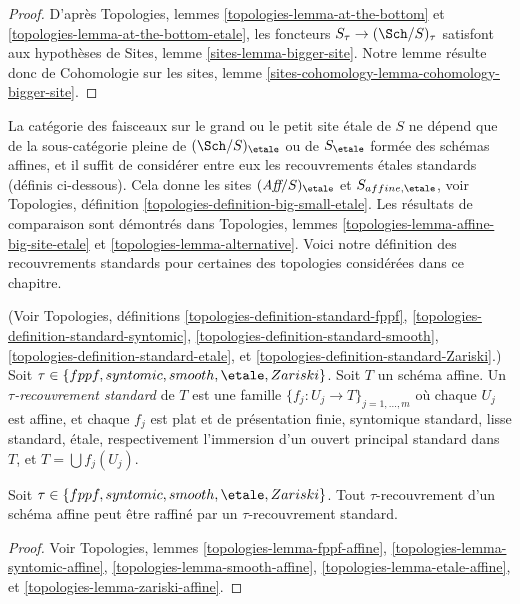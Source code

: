 \begin{proof}
D'apr\`es
Topologies, lemmes \ref{topologies-lemma-at-the-bottom} et
\ref{topologies-lemma-at-the-bottom-etale},
les foncteurs $S_\tau \to (\Sch/S)_\tau$
satisfont aux hypoth\`eses de
Sites, lemme \ref{sites-lemma-bigger-site}.
Notre lemme r\'esulte donc de
Cohomologie sur les sites, lemme \ref{sites-cohomology-lemma-cohomology-bigger-site}.
\end{proof}

\noindent
La cat\'egorie des faisceaux sur le grand ou le petit site \'etale de $S$ ne d\'epend que
de la sous-cat\'egorie pleine de $(\Sch/S)_\etale$ ou de $S_\etale$ form\'ee des
sch\'emas affines, et il suffit de consid\'erer entre eux les recouvrements \'etales standards
(d\'efinis ci-dessous). Cela donne les sites
$(\textit{Aff}/S)_\etale$ et $S_{affine, \etale}$, voir
Topologies, définition \ref{topologies-definition-big-small-etale}.
Les r\'esultats de comparaison sont d\'emontr\'es dans Topologies,
lemmes \ref{topologies-lemma-affine-big-site-etale} et
\ref{topologies-lemma-alternative}. Voici notre d\'efinition des
recouvrements standards pour certaines des topologies consid\'er\'ees dans ce chapitre.

\begin{definition}
\label{definition-standard-tau}
(Voir
Topologies, définitions
\ref{topologies-definition-standard-fppf},
\ref{topologies-definition-standard-syntomic},
\ref{topologies-definition-standard-smooth},
\ref{topologies-definition-standard-etale}, et
\ref{topologies-definition-standard-Zariski}.)
Soit $\tau \in \{fppf, syntomic, smooth, \etale, Zariski\}$.
Soit $T$ un sch\'ema affine.
Un {\it $\tau$-recouvrement standard} de $T$ est une famille
$\{f_j : U_j \to T\}_{j = 1, \ldots, m}$ o\`u chaque $U_j$ est affine,
et chaque $f_j$ est plat et de pr\'esentation finie,
syntomique standard, lisse standard, \'etale, respectivement l'immersion d'un
ouvert principal standard dans $T$, et $T = \bigcup f_j(U_j)$.
\end{definition}

\begin{lemma}
\label{lemma-tau-affine}
Soit $\tau \in \{fppf, syntomic, smooth, \etale, Zariski\}$.
Tout $\tau$-recouvrement d'un sch\'ema affine peut \^etre raffin\'e par un
$\tau$-recouvrement standard.
\end{lemma}

\begin{proof}
Voir
Topologies, lemmes
\ref{topologies-lemma-fppf-affine},
\ref{topologies-lemma-syntomic-affine},
\ref{topologies-lemma-smooth-affine},
\ref{topologies-lemma-etale-affine}, et
\ref{topologies-lemma-zariski-affine}.
\end{proof}

